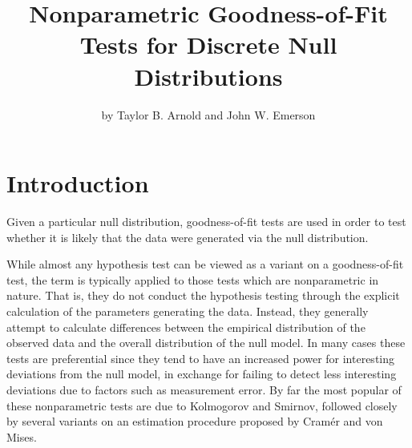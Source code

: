 \title{Nonparametric Goodness-of-Fit Tests for Discrete Null Distributions}
\author{by Taylor B. Arnold and John W. Emerson}

\maketitle




\section{Introduction}

Given a particular null distribution, goodness-of-fit tests 
are used in order to test whether it is likely that the data were generated via the null distribution.

While almost any hypothesis test can be viewed as a variant on a goodness-of-fit test, the term is typically
applied to those tests which are nonparametric in nature. That is, they do not conduct the hypothesis testing 
through the explicit calculation of the parameters generating the data. Instead, they generally attempt to 
calculate differences between the empirical distribution of the observed data and the overall distribution 
of the null model. In many cases these tests are preferential since they tend to have an increased power for 
interesting deviations from the null model, in exchange for failing to detect less interesting deviations due to 
factors such as measurement error. By far the most popular of these nonparametric tests are due to Kolmogorov and 
Smirnov, followed closely by several variants on an estimation procedure proposed by Cram\'{e}r and von Mises. 


